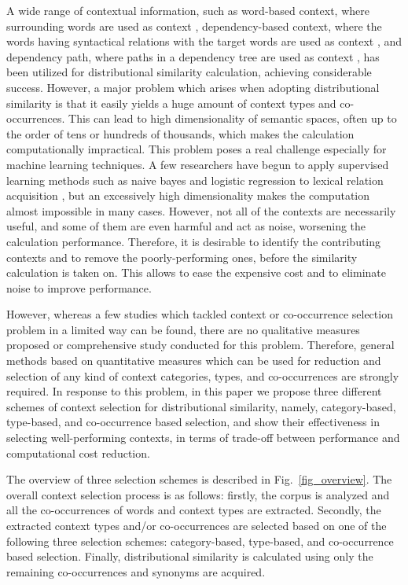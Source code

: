\documentclass[english]{jnlp_1.4}
\begin{document}
A wide range of contextual information, such as word-based context,
where surrounding words are used as context
\cite{Lowe:00,Curran:02:scaling}, dependency-based context, where the
words having syntactical relations with the target words are used as
context \cite{Hindle:90,Ruge:97,Lin:98:automatic}, and dependency
path, where paths in a dependency tree are used as context
\cite{Lin:01,Pado:07}, has been utilized for distributional similarity
calculation, achieving considerable success. However, a major problem
which arises when adopting distributional similarity is that it easily
yields a huge amount of context types and co-occurrences. This can
lead to high dimensionality of semantic spaces, often up to the order
of tens or hundreds of thousands, which makes the calculation
computationally impractical. This problem poses a real challenge
especially for machine learning techniques. A few researchers have
begun to apply supervised learning methods such as naive bayes and
logistic regression to lexical relation acquisition \cite{Snow:04}, but
an excessively high dimensionality makes the computation almost
impossible in many cases. However, not all of the contexts are
necessarily useful, and some of them are even harmful and act as
noise, worsening the calculation performance. Therefore, it is
desirable to identify the contributing contexts and to remove the
poorly-performing ones, before the similarity calculation is taken
on. This allows to ease the expensive cost and to eliminate noise to
improve performance.


However, whereas a few studies which tackled context or co-occurrence
selection problem in a limited way can be found, there are no
qualitative measures proposed or comprehensive study conducted for
this problem. Therefore, general methods based on quantitative
measures which can be used for reduction and selection of any kind of
context categories, types, and co-occurrences are strongly
required. In response to this problem, in this paper we propose three
different schemes of context selection for distributional similarity,
namely, category-based, type-based, and co-occurrence based selection,
and show their effectiveness in selecting well-performing contexts, in
terms of trade-off between performance and computational cost
reduction.



The overview of three selection schemes is described in
Fig.~{\ref{fig_overview}}. The overall context selection process is as
follows: firstly, the corpus is analyzed and all the co-occurrences of
words and context types are extracted. Secondly, the extracted context
types and/or co-occurrences are selected based on one of the following
three selection schemes: category-based, type-based, and co-occurrence
based selection. Finally, distributional similarity is calculated
using only the remaining co-occurrences and synonyms are acquired.
\end{document}
